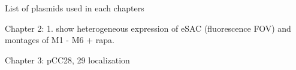 List of plasmids used in each chapters

Chapter 2: 1. show heterogeneous expression of eSAC (fluorescence FOV) and montages of M1 - M6 + rapa.

Chapter 3: pCC28, 29 localization